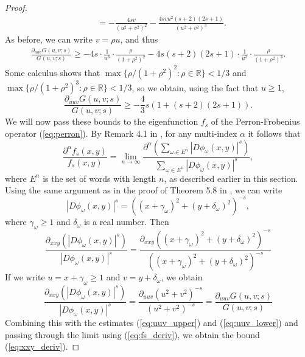 \documentclass[10pt]{article}
\theoremstyle{definition}
\numberwithin{equation}{section}
\numberwithin{figure}{section}
\numberwithin{table}{section}
\begin{document}
\begin{proof}
\begin{align*}
&=-\frac{4sv}{(u^2+v^2)^2}-\frac{4svu^2(s+2)(2s+1)}{(u^2+v^2)^3}.
\end{align*}
As before, we can write $v=\rho u$, and thus
\begin{align*}
\frac{\partial_{uuv}G(u,v;s)}{G(u,v;s)}\geq-4s\cdot\frac{1}{u^3}\cdot\frac{\rho}{(1+\rho^2)^2}-4s(s+2)(2s+1)\cdot\frac{1}{u^3}\cdot\frac{\rho}{(1+\rho^2)^3}.
\end{align*}
Some calculus shows that $\max\{\rho/(1+\rho^2)^2:\rho\in\mathbb{R}\}<1/3$ and $\max\{\rho/(1+\rho^2)^3:\rho\in\mathbb{R}\}<1/3$, so we obtain, using the fact that $u\geq1$,
\begin{equation}
\frac{\partial_{uuv}G(u,v;s)}{G(u,v;s)}\geq-\frac{4}{3}s(1+(s+2)(2s+1)).
\label{eq:uuv_lower}
\end{equation}
We will now pass these bounds to the eigenfunction $f_s$ of the Perron-Frobenius operator (\ref{eq:perron}). By Remark 4.1 in \cite{falk2018new}, for any multi-index $\alpha$ it follows that
\begin{equation}
\frac{\partial^\alpha f_s(x,y)}{f_s(x,y)}=\lim_{n\to\infty}\frac{\partial^\alpha(\sum_{\omega\in E^n}|D\phi_\omega(x,y)|^s)}{\sum_{\omega\in E^n}|D\phi_\omega(x,y)|^s},
\label{eq:fs_deriv}
\end{equation}
where $E^n$ is the set of words with length $n$, as described earlier in this section. Using the same argument as in the proof of Theorem 5.8 in \cite{falk2018new}, we can write
$$|D\phi_\omega(x,y)|^s=((x+\gamma_\omega)^2+(y+\delta_\omega)^2)^{-s},$$
where $\gamma_\omega\geq1$ and $\delta_\omega$ is a real number. Then
$$\frac{\partial_{xxy}(|D\phi_\omega(x,y)|^s)}{|D\phi_\omega(x,y)|^s}=\frac{\partial_{xxy}((x+\gamma_\omega)^2+(y+\delta_\omega)^2)^{-s}}{((x+\gamma_\omega)^2+(y+\delta_\omega)^2)^{-s}}$$
If we write $u=x+\gamma_\omega\geq1$ and $v=y+\delta_\omega$, we obtain
$$\frac{\partial_{xxy}(|D\phi_\omega(x,y)|^s)}{|D\phi_\omega(x,y)|^s}=\frac{\partial_{uuv}(u^2+v^2)^{-s}}{(u^2+v^2)^{-s}}=\frac{\partial_{uuv}G(u,v;s)}{G(u,v;s)}$$
Combining this with the estimates (\ref{eq:uuv_upper}) and (\ref{eq:uuv_lower}) and passing through the limit using (\ref{eq:fs_deriv}), we obtain the bound (\ref{eq:xxy_deriv}).


\end{proof}
\end{document}
